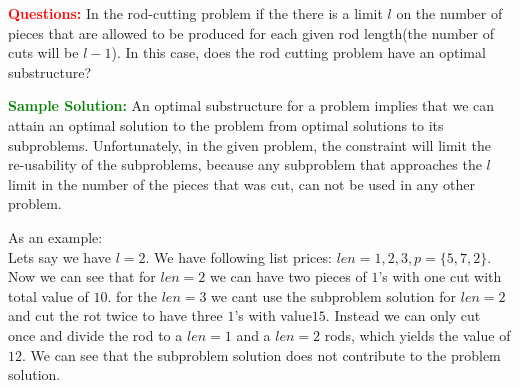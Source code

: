 \problem

\textcolor{Red}{\textbf{Questions:}}
In the rod-cutting problem if the there is a limit $l$ on the number of pieces that are allowed to be produced for each given rod length(the number of cuts will be $l-1$). In this case, does the rod cutting problem have an optimal substructure?

\textcolor{Green}{\textbf{Sample Solution:}}
An optimal substructure for a problem implies that we can attain an optimal solution to the problem from optimal solutions to its subproblems. Unfortunately, in the given problem, the constraint will limit the re-usability of the subproblems, because any subproblem that approaches the $l$ limit in the number of the pieces that was cut, can not be used in any other problem.

As an example:\\
Lets say we have $l = 2$. We have following list prices: $len = {1,2,3}, p =\{5,7,2\}$. Now we can see that for $len = 2$ we can have two pieces of $1$'s with one cut with total value of $10$. for the $len=3$ we cant use the subproblem solution for $len=2$ and cut the rot twice to have three $1$'s with value$15$. Instead we can only cut once and divide the rod to a $len=1$ and a $len=2$ rods, which yields the value of $12$. We can see that the subproblem solution does not contribute to the problem solution.

